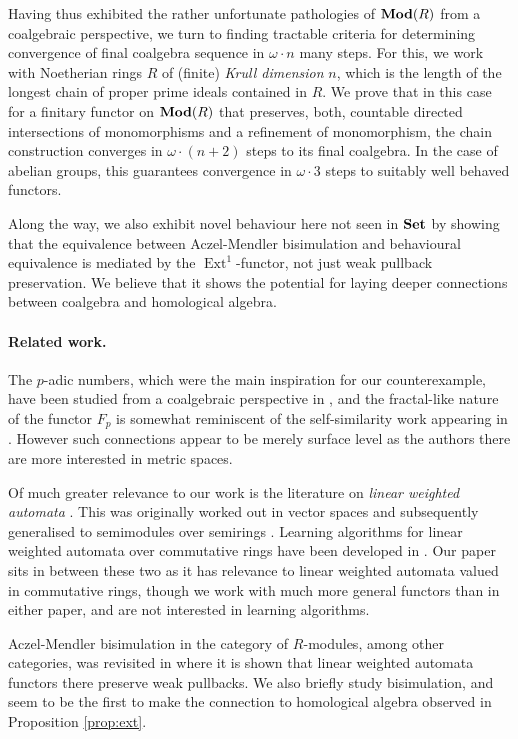 \documentclass[runningheads]{llncs}
\begin{document}
Having thus exhibited the rather unfortunate pathologies of $\operatorname{\mathbf{Mod}}(R)$ from a coalgebraic perspective, we turn to finding tractable criteria for determining convergence of final coalgebra sequence in $\omega \cdot n$ many steps.
For this, we work with Noetherian rings $R$ of (finite) \emph{Krull dimension} $n$, which is the length of the longest chain of proper prime ideals contained in $R$.
We prove that in this case for a finitary functor on $\operatorname{\mathbf{Mod}}(R)$ that preserves, both, countable directed intersections of monomorphisms and a refinement of monomorphism, the chain construction converges in $\omega \cdot (n+2)$ steps to its final coalgebra.
In the case of abelian groups, this guarantees convergence in $\omega\cdot 3$ steps to suitably well behaved functors.

Along the way, we also exhibit novel behaviour here not seen in $\mathbf{Set}$ by showing that the equivalence between Aczel-Mendler bisimulation and behavioural equivalence is mediated by the $\operatorname{Ext}^1$-functor, not just weak pullback preservation\cite{Rutten00,Staton2011-Bisim}.
We believe that it shows the potential for laying deeper connections between coalgebra and homological algebra.

\paragraph{Related work.}
The $p$-adic numbers, which were the main inspiration for our counterexample, have been studied from a coalgebraic perspective in  \cite{Bhattacharya15}, and the fractal-like nature of the functor $F_p$ is somewhat reminiscent of the self-similarity work appearing in \cite{leinster11, schmid25}. However such connections appear to be merely surface level as the authors there are more interested in metric spaces.

Of much greater relevance to our work is the literature on \emph{linear weighted automata} \cite{Boreale09, bonchi12}. This was originally worked out in vector spaces and subsequently generalised to semimodules over semirings \cite{Bhaduri23}. Learning algorithms for linear weighted automata over commutative rings have been developed in \cite{rot20, aristote26}. Our paper sits in between these two as it has relevance to linear weighted automata valued in commutative rings, though we work with much more general functors than in either paper, and are not interested in learning algorithms. 

Aczel-Mendler bisimulation in the category of $R$-modules, among other categories, was revisited in \cite{dubut25} where it is shown that linear weighted automata functors there preserve weak pullbacks. We also briefly study bisimulation, and seem to be the first to make the connection to homological algebra observed in Proposition \ref{prop:ext}.  
\end{document}
